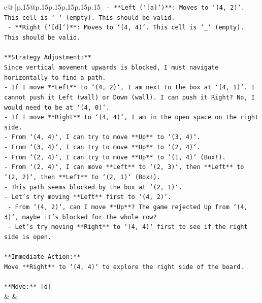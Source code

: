 \documentclass{article}
\begin{document}
{\begin{supertabular}{c@{$\;$}|p{.15\linewidth}@{}p{.15\linewidth}p{.15\linewidth}p{.15\linewidth}p{.15\linewidth}p{.15\linewidth}}
{{{\texttt{    {-} **Left (`{[}a{]}`)**: Moves to `(4, 2)`. This cell is `\_` (empty). This should be valid.} \\
\texttt{    {-} **Right (`{[}d{]}`)**: Moves to `(4, 4)`. This cell is `\_` (empty). This should be valid.} \\
\\ 
\texttt{**Strategy Adjustment:**} \\
\texttt{Since vertical movement upwards is blocked, I must navigate horizontally to find a path.} \\
\texttt{{-} If I move **Left** to `(4, 2)`, I am next to the box at `(4, 1)`. I cannot push it Left (wall) or Down (wall). I can push it Right? No, I would need to be at `(4, 0)`.} \\
\texttt{{-} If I move **Right** to `(4, 4)`, I am in the open space on the right side.} \\
\texttt{{-} From `(4, 4)`, I can try to move **Up** to `(3, 4)`.} \\
\texttt{{-} From `(3, 4)`, I can try to move **Up** to `(2, 4)`.} \\
\texttt{{-} From `(2, 4)`, I can try to move **Up** to `(1, 4)` (Box!).} \\
\texttt{{-} From `(2, 4)`, I can move **Left** to `(2, 3)`, then **Left** to `(2, 2)`, then **Left** to `(2, 1)` (Box!).} \\
\texttt{{-} This path seems blocked by the box at `(2, 1)`.} \\
\texttt{{-} Let's try moving **Left** first to `(4, 2)`.} \\
\texttt{    {-} From `(4, 2)`, can I move **Up**? The game rejected Up from `(4, 3)`, maybe it's blocked for the whole row?} \\
\texttt{    {-} Let's try moving **Right** to `(4, 4)` first to see if the right side is open.} \\
\\ 
\texttt{**Immediate Action:**} \\
\texttt{Move **Right** to `(4, 4)` to explore the right side of the board.} \\
\\ 
\texttt{**Move:** {[}d{]}} \\
            }
        }
    }
    & & \\ \\


\end{supertabular}}
\end{document}
